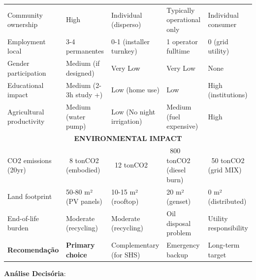 \documentclass[12pt, a4paper]{article}
\begin{document}
\begin{table}[H]
\begin{tabular}{|l|l|l|l|l|}
\hline
Community ownership & High & Individual (disperso) & Typically operational only & Individual consumer \\
Employment local & 3-4 permanentes & 0-1 (installer turnkey) & 1 operator fulltime & 0 (grid utility) \\
Gender participation & Medium (if designed) & Very Low & Very Low & None \\
Educational impact & Medium (2-3h study +) & Low (home use) & Low & High (institutions) \\
Agricultural productivity & Medium (water pump) & Low (No night irrigation) & Medium (fuel expensive) & High \\
\hline
\multicolumn{5}{|c|}{\textbf{ENVIRONMENTAL IMPACT}} \\
\hline
CO2 emissions (20yr) & ~8 tonCO2 (embodied) & ~12 tonCO2 & ~800 tonCO2 (diesel burn) & ~50 tonCO2 (grid MIX) \\
Land footprint & 50-80 m² (PV panels) & 10-15 m² (rooftop) & 20 m² (genset) & 0 m² (distributed) \\
End-of-life burden & Moderate (recycling) & Moderate (recycling) & Oil disposal problem & Utility responsibility \\
\hline
\textbf{Recomendação} & \textbf{Primary choice} & Complementary (for SHS) & Emergency backup & Long-term target \\
\hline
\end{tabular}
\end{table}

\textbf{Análise Decisória}:
\end{document}
